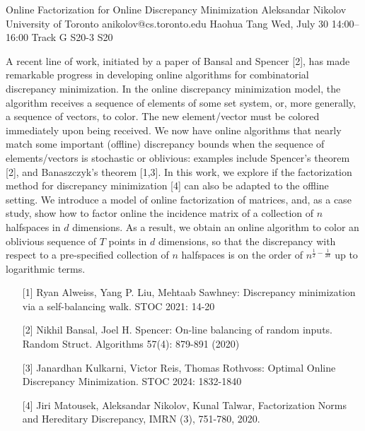 \begin{talk}
  {Online Factorization for Online Discrepancy Minimization}%
  {Aleksandar Nikolov}%
  {University of Toronto}%
  {anikolov@cs.toronto.edu}%
  {Haohua Tang}%
  {}%
  {Wed, July 30 14:00–16:00 Track G}%
  {S20-3}%
  {S20}%
  
				
			
A recent line of work, initiated by a paper of Bansal and Spencer [2], has made remarkable progress in developing online algorithms for combinatorial discrepancy minimization. In the online discrepancy minimization model, the algorithm receives a sequence of elements of some set system, or, more generally, a sequence of vectors, to color. The new element/vector must be colored immediately upon being received. We now have online algorithms that nearly match some important (offline) discrepancy bounds when the sequence of elements/vectors is stochastic or oblivious: examples include Spencer's theorem [2], and Banaszczyk's theorem [1,3]. In this work, we explore if the factorization method for discrepancy minimization [4] can also be adapted to the offline setting. We introduce a model of online factorization of matrices, and, as a case study, show how to factor online the incidence matrix of a collection of $n$ halfspaces in $d$ dimensions. As a result, we obtain an online algorithm to color an oblivious sequence of $T$ points in $d$ dimensions, so that the discrepancy with respect to a pre-specified collection of $n$ halfspaces is on the order of $n^{\frac12 - \frac{1}{2d}}$ up to logarithmic terms. 

\medskip

\begin{enumerate}
    \item[{[1]}] Ryan Alweiss, Yang P. Liu, Mehtaab Sawhney:
Discrepancy minimization via a self-balancing walk. STOC 2021: 14-20

	\item[{[2]}] Nikhil Bansal, Joel H. Spencer:
On-line balancing of random inputs. Random Struct. Algorithms 57(4): 879-891 (2020)

    \item[{[3]}] Janardhan Kulkarni, Victor Reis, Thomas Rothvoss:
Optimal Online Discrepancy Minimization. STOC 2024: 1832-1840

    \item[{[4]}] Jiri Matousek, Aleksandar Nikolov, Kunal Talwar, Factorization Norms and Hereditary Discrepancy, IMRN (3), 751-780, 2020. 

\end{enumerate}
\end{talk}

